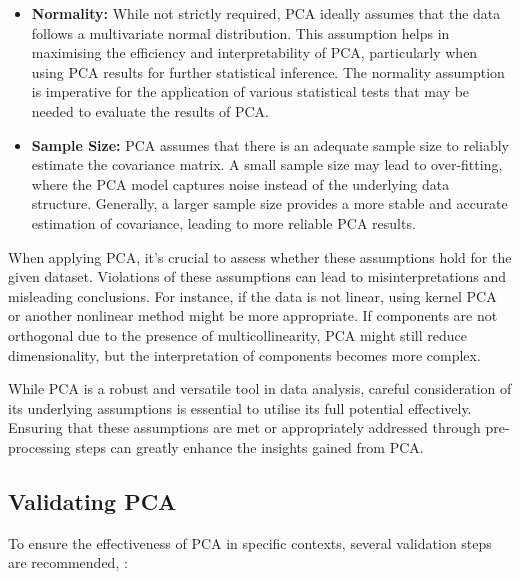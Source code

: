 \documentclass[conference]{IEEEtran}
\begin{document}
\begin{itemize}
    \item \textbf{Normality:} While not strictly required, PCA ideally assumes that the data follows a multivariate normal distribution. This assumption helps in maximising the efficiency and interpretability of PCA, particularly when using PCA results for further statistical inference. The normality assumption is imperative for the application of various statistical tests that may be needed to evaluate the results of PCA.
    
    \item \textbf{Sample Size:} PCA assumes that there is an adequate sample size to reliably estimate the covariance matrix. A small sample size may lead to over-fitting, where the PCA model captures noise instead of the underlying data structure. Generally, a larger sample size provides a more stable and accurate estimation of covariance, leading to more reliable PCA results.
\end{itemize}

When applying PCA, it's crucial to assess whether these assumptions hold for the given dataset. Violations of these assumptions can lead to misinterpretations and misleading conclusions. For instance, if the data is not linear, using kernel PCA or another nonlinear method might be more appropriate. If components are not orthogonal due to the presence of multicollinearity, PCA might still reduce dimensionality, but the interpretation of components becomes more complex.

While PCA is a robust and versatile tool in data analysis, careful consideration of its underlying assumptions is essential to utilise its full potential effectively. Ensuring that these assumptions are met or appropriately addressed through pre-processing steps can greatly enhance the insights gained from PCA.


\subsection{Validating PCA}

To ensure the effectiveness of PCA in specific contexts, several validation steps are recommended, \cite{bro2014principal, shlens2014tutorial, wold1987principal, candes2011robust, mckeown1998independent}:
\end{document}

